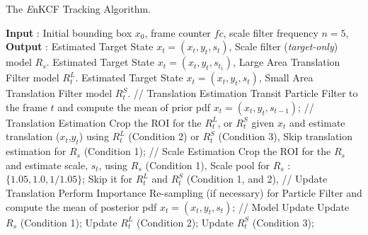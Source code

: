 \documentclass{bmvc2k}
\begin{document}
\begin{algorithm}
	\caption{The {\it E}nKCF Tracking Algorithm.}\label{alg:MKCF}
	\begin{algorithmic}[1]
	\State \textbf{Input} : Initial bounding box $x_{0}$, frame counter $fc$, scale filter frequency $n = 5$,
	\State \textbf{Output} : 
				 
						\State Estimated Target State $x_{t} = (x_{t},y_{t},s_{t})$,
						Scale filter (\textit{target-only}) model $R_{s}$.
			     \EndIf
						\State Estimated Target State $x_{t} = (x_{t},y_{t},s_{t_1})$,
						Large Area Translation Filter model $R_{t}^{L}$.
				\EndIf
						\State Estimated Target State $x_{t} = (x_{t},y_{t},s_{t})$,
						Small Area Translation Filter model $R_{t}^{S}$.
				\EndIf
				\State // Translation Estimation
				\State Transit Particle Filter to the frame $t$ and compute the mean of prior pdf $x_{t} = (x_{t},y_{t},s_{t-1})$;
				\State // Translation Estimation
				\State Crop the ROI for the $R_{t}^{L}$, or $R_{t}^{S}$ given $x_{t}$
				and estimate translation ($x_{t}$,$y_{t}$) using $R_{t}^{L}$ (Condition 2) or $R_{t}^{S}$ (Condition 3),
				\State Skip translation estimation for $R_{s}$ (Condition 1);
				\State // Scale Estimation
			    \State Crop the ROI for the $R_{s}$ and estimate scale, $s_{t}$, using $R_{s}$ (Condition 1), 
				\State Scale pool for $R_{s}$ : $\lbrace1.05,1.0,1/1.05\rbrace$;
		        \State Skip it for $R_{t}^{L}$ and $R_{t}^{S}$ (Condition 1, and 2),
				\State // Update Translation
				\State Perform Importance Re-sampling (if necessary) for Particle Filter and compute the mean of posterior pdf $x_{t} = (x_{t},y_{t},s_{t})$;
			    \State // Model Update
				\State Update $R_{s}$ (Condition 1);
				\EndIf							 
				\State Update $R_{t}^{L}$ (Condition 2);
				\EndIf	
				\State Update $R_{t}^{S}$ (Condition 3);
			     \EndIf		
	\EndProcedure	
	\end{algorithmic}
\end{algorithm}

\end{document}
